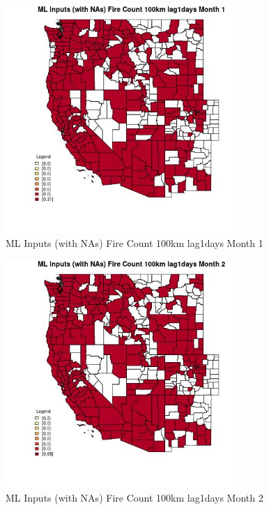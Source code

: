 \begin{figure} 
\centering  
\includegraphics[width=0.77\textwidth]{Code_Outputs/Report_ML_input_PM25_Step4_part_e_de_duplicated_aves_compiled_2019-05-21wNAs_CountyFire_Count_100km_lag1daysmedianMonth1.jpg} 
\caption{\label{fig:Report_ML_input_PM25_Step4_part_e_de_duplicated_aves_compiled_2019-05-21wNAsCountyFire_Count_100km_lag1daysmedianMonth1}ML Inputs (with NAs) Fire Count 100km lag1days Month 1} 
\end{figure} 
 

\begin{figure} 
\centering  
\includegraphics[width=0.77\textwidth]{Code_Outputs/Report_ML_input_PM25_Step4_part_e_de_duplicated_aves_compiled_2019-05-21wNAs_CountyFire_Count_100km_lag1daysmedianMonth2.jpg} 
\caption{\label{fig:Report_ML_input_PM25_Step4_part_e_de_duplicated_aves_compiled_2019-05-21wNAsCountyFire_Count_100km_lag1daysmedianMonth2}ML Inputs (with NAs) Fire Count 100km lag1days Month 2} 
\end{figure} 
 

